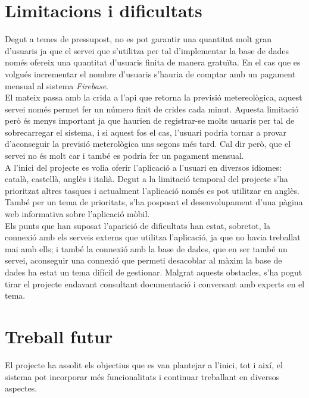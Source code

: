 \section{Limitacions i dificultats}
Degut a temes de pressupost, no es pot garantir una quantitat molt gran d'usuaris ja que el servei que s'utilitza per tal d'implementar la base de dades només ofereix una quantitat d'usuaris finita de manera gratuïta. En el cas que es volgués incrementar el nombre d'usuaris s'hauria de comptar amb un pagament mensual al sistema \textit{Firebase}.\\

El mateix passa amb la crida a l'api que retorna la previsió metereològica, aquest servei només permet fer un número finit de crides cada minut. Aquesta limitació però és menys important ja que haurien de registrar-se molts usuaris per tal de sobrecarregar el sistema, i si aquest fos el cas, l'usuari podria tornar a provar d'aconseguir la previsió meterològica uns segons més tard. Cal dir però, que el servei no és molt car i també es podria fer un pagament mensual.\\

A l'inici del projecte es volia oferir l'aplicació a l'usuari en diversos idiomes: català, castellà, anglès i italià. Degut a la limitació temporal del projecte s'ha prioritzat altres tasques i actualment l'aplicació només es pot utilitzar en anglès. També per un tema de prioritats, s'ha posposat el desenvolupament d'una pàgina web informativa sobre l'aplicació mòbil.\\

Els punts que han suposat l'aparició de dificultats han estat, sobretot, la connexió amb els serveis externs que utilitza l'aplicació, ja que no havia treballat mai amb ells; i també la connexió amb la base de dades, que en ser també un servei, aconseguir una connexió que permeti desacoblar al màxim la base de dades ha estat un tema difícil de gestionar. Malgrat aquests obstacles, s'ha pogut tirar el projecte endavant consultant documentació i conversant amb experts en el tema.


\section{Treball futur}

El projecte ha assolit els objectius que es van plantejar a l'inici, tot i així, el sistema pot incorporar més funcionalitats i continuar treballant en diversos aspectes.\\

